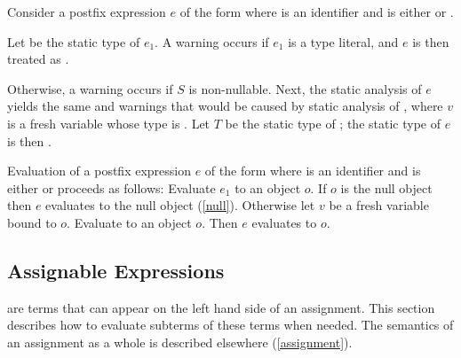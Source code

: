 \documentclass[makeidx]{article}
\begin{document}
{\LMHash{}%
Consider a postfix expression $e$ of the form 
where \id{} is an identifier and \op{} is either \lit{++} or \lit{-{}-}.

\LMHash{}%
Let  be the static type of $e_1$.
A warning occurs if $e_1$ is a type literal,
and $e$ is then treated as .

\LMHash{}%
Otherwise, a warning occurs if $S$ is non-nullable.
Next, the static analysis of $e$ yields
the same  and warnings that would be caused by
static analysis of ,
where $v$ is a fresh variable whose type is .
Let $T$ be the static type of ;
the static type of $e$ is then .

\LMHash{}%
Evaluation of a postfix expression $e$ of the form 
where \id{} is an identifier and \op{} is either \lit{++} or \lit{-{}-}
proceeds as follows:
Evaluate $e_1$ to an object $o$.
If $o$ is the null object then $e$ evaluates to the null object
(\ref{null}).
Otherwise let $v$ be a fresh variable bound to $o$.
Evaluate  to an object $o$.
Then $e$ evaluates to $o$.
\EndCase


\subsection{Assignable Expressions}

\LMHash{}%
 are terms
that can appear on the left hand side of an assignment.
This section describes how to evaluate subterms of these terms when needed.
The semantics of an assignment as a whole is described elsewhere
(\ref{assignment}).


}
\end{document}
